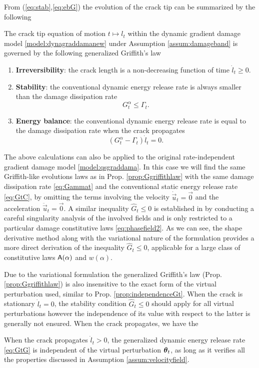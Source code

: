 From (\ref{eq:stab},\ref{eq:ebG}) the evolution of the crack tip can be summarized by the following
\begin{proposition} \label{prop:Ggriffithlaw}
The crack tip equation of motion $t\mapsto l_t$ within the dynamic gradient damage model \ref{model:dynagraddamanew} under Assumption \ref{assum:damageband} is governed by the following generalized Griffith's law
\begin{enumerate}
\item \textbf{Irreversibility}: the crack length is a non-decreasing function of time $\dot{l}_t\geq 0$.
\item \textbf{Stability}: the conventional dynamic energy release rate is always smaller than the damage dissipation rate
\[
G_t^\alpha\leq\Gamma_t.
\] 
\item \textbf{Energy balance}: the conventional dynamic energy release rate is equal to the damage dissipation rate when the crack propagates
\[
(G_t^\alpha-\Gamma_t)\dot{l}_t=0.
\] 
\end{enumerate}
\end{proposition}

The above calculations can also be applied to the original rate-independent gradient damage model \ref{model:qsgraddama}. In this case we will find the same Griffith-like evolutions laws as in Prop. \ref{prop:Ggriffithlaw} with the same damage dissipation rate \eqref{eq:Gammat} and the conventional static energy release rate \eqref{eq:GtC}, by omitting the terms involving the velocity $\dot{\vec{u}}_t=\vec{0}$ and the acceleration $\ddot{\vec{u}}_t=\vec{0}$. A similar inequality $\widehat{G}_t\leq 0$ is established in \cite{SicsicMarigo:2013} by conducting a careful singularity analysis of the involved fields and is only restricted to a particular damage constitutive laws \eqref{eq:phasefield2}. As we can see, the shape derivative method along with the variational nature of the formulation provides a more direct derivation of the inequality $\widehat{G}_t\leq 0$, applicable for a large class of constitutive laws $\mathsf{A}(\alpha)$ and $w(\alpha)$.

Due to the variational formulation the generalized Griffith's law (Prop. \ref{prop:Ggriffithlaw}) is also insensitive to the exact form of the virtual perturbation used, similar to Prop. \ref{prop:independenceGt}. When the crack is stationary $\dot{l}_t=0$, the stability condition $\widehat{G}_t\leq 0$ should apply for all virtual perturbations however the independence of its value with respect to the latter is generally not ensured. When the crack propagates, we have the
\begin{proposition} \label{prop:independenceGtG}
When the crack propagates $\dot{l}_t>0$, the generalized dynamic energy release rate \eqref{eq:GtG} is independent of the virtual perturbation $\vtheta_t$, as long as it verifies all the properties discussed in Assumption \ref{assum:velocityfield}.
\end{proposition}

